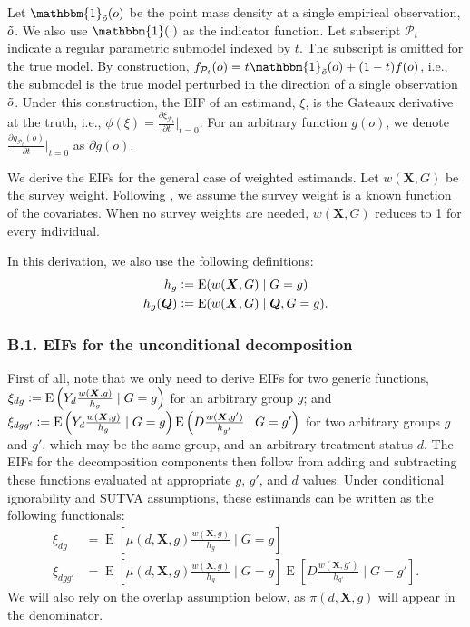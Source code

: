 \documentclass[12pt,a4paper]{article}
\newcommand{\E}{\operatorname{E}}
\def\X{{\boldsymbol X}}
\def\Q{{\boldsymbol Q}}
\def\one{\mathbbm{1}}
\newcommand{\defeq}{\vcentcolon=}
\begin{document}
Let $\one_{\Tilde{o}}(o)$ be the point mass density at a single empirical observation,  $\Tilde{o}$. We also use $\one(\cdot)$ as the indicator function. Let subscript $\mathcal{P}_t$ indicate a regular parametric submodel indexed by $t$. The subscript is omitted for the true model. By construction, $f_{\mathcal{P}_t}(o)=t \one_{\Tilde{o}}(o) + (1-t)f(o)$, i.e., the submodel is the true model perturbed in the direction of a single observation $\Tilde{o}$. Under this construction, the EIF of an estimand, $\xi$, is the Gateaux derivative at the truth, i.e., $\phi(\xi)=\frac{\partial \xi_{\mathcal{P}_t}}{\partial t} \big|_{t=0}$. For an arbitrary function $g(o)$, we denote $ \frac{\partial g_{\mathcal{P}_t}(o)}{\partial t} \big|_{t=0}$ as $\partial g(o)$. 

We derive the EIFs for the general case of  weighted estimands. Let $w(\X,  G)$ be the  survey weight. Following \citet{hirano_efficient_2003}, we assume the survey weight is a known function of the covariates. When no survey weights are needed, $w(\X, G)$ reduces to 1 for every individual.

In this derivation, we also use the following definitions:
\begin{align*}
    h_g & \defeq \E(w(\X,  G) \mid G=g) \\
    h_g(\Q) & \defeq \E(w(\X,  G) \mid \Q, G=g).
\end{align*}

\subsubsection*{B.1. EIFs for the unconditional decomposition}
First of all, note that we only need to derive EIFs for two generic functions, $\xi_{dg} \defeq \E \left(Y_d \frac{ w(\X,g)}{h_g} \mid G=g  \right)$ for an arbitrary group $g$; and $\xi_{dgg'} \defeq \E \left(Y_d \frac{ w(\X,g)}{h_g} \mid G=g \right)\E \left(D \frac{ w(\X,g')}{h_{g'}}  \mid G=g' \right)$ for two arbitrary groups $g$ and $g'$, which may be the same group, and an arbitrary treatment status $d$. The EIFs for the decomposition components then follow from adding and subtracting these functions evaluated at appropriate $g$, $g'$, and $d$ values. Under conditional ignorability and SUTVA assumptions, these estimands can be written as the following functionals:
\begin{align*}
    \xi_{dg} &= \E \left[\mu(d,\X,g) \frac{ w(\X,g)}{h_g} \mid G=g \right] \\
    \xi_{dgg'} &= \E \left[\mu(d,\X,g) \frac{ w(\X,g)}{h_g} \mid G=g \right] \E \left[D \frac{ w(\X,g')}{h_{g'}}  \mid G=g' \right].
\end{align*}
We will also rely on the overlap assumption below, as $\pi(d,\X,g)$ will appear in the denominator.
\end{document}
